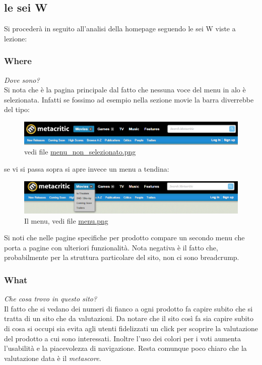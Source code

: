 \documentclass[12pt]{article}
\begin{document}
\subsection{le sei W}
Si procederà in seguito all'analisi della homepage seguendo le sei W viste a lezione:

\subsubsection{Where}
\textit{Dove sono?}\\
Si nota che è la pagina principale dal fatto che nessuna voce del menu in alo è selezionata.
Infatti se fossimo ad esempio nella sezione movie la barra diverrebbe del tipo:
\begin{figure}[H]
	\begin{center}
		\includegraphics[width=13.5cm]{menu_non_selezionato.png}
		\caption{vedi file \href{menu_non_selezionato.png}{menu\_non\_selezionato.png}}
	\end{center}
\end{figure}
se vi si passa sopra si apre invece un menu a tendina:
\begin{figure}[H]
	\begin{center}
		\includegraphics[width=13.5cm]{menu.png}
		\caption{Il menu, vedi file \href{menu.png}{menu.png}}
	\end{center}
\end{figure}
Si noti che nelle pagine specifiche per prodotto compare un secondo menu che porta a pagine con ulteriori funzionalità.
Nota negativa è il fatto che, probabilmente per la struttura particolare del sito, non ci sono breadcrump.
\subsubsection{What}
\textit{Che cosa trovo in questo sito?}\\
Il fatto che si vedano dei numeri di fianco a ogni prodotto fa capire subito che si tratta di un sito che da valutazioni. Da notare che il sito così fa sia capire subito di cosa si occupi sia evita agli utenti fidelizzati un click per scoprire la valutazione del prodotto a cui sono interessati. Inoltre l'uso dei colori per i voti aumenta l'usabilità e la piacevolezza di navigazione. Resta comunque poco chiaro che la valutazione data è il \textit{metascore}.
\end{document}
